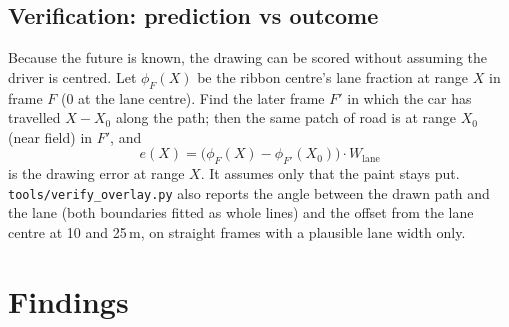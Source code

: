 \documentclass[10pt,a4paper]{article}
\begin{document}
\subsection{Verification: prediction vs outcome}
Because the future is known, the drawing can be scored without assuming the driver is centred. Let
$\phi_F(X)$ be the ribbon centre's lane fraction at range $X$ in frame $F$ (0 at the lane centre). Find the
later frame $F'$ in which the car has travelled $X - X_0$ along the path; then the same patch of road is
at range $X_0$ (near field) in $F'$, and
\begin{equation}
e(X) = \big(\phi_F(X) - \phi_{F'}(X_0)\big)\cdot W_\text{lane}
\end{equation}
is the drawing error at range $X$. It assumes only that the paint stays put. \texttt{tools/verify\_overlay.py}
also reports the angle between the drawn path and the lane (both boundaries fitted as whole lines) and the
offset from the lane centre at 10 and 25\,m, on straight frames with a plausible lane width only.

\section{Findings}
\label{sec:findings}
\end{document}
